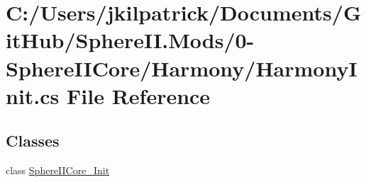 \hypertarget{0-_sphere_i_i_core_2_harmony_2_harmony_init_8cs}{}\section{C\+:/\+Users/jkilpatrick/\+Documents/\+Git\+Hub/\+Sphere\+II.Mods/0-\/\+Sphere\+I\+I\+Core/\+Harmony/\+Harmony\+Init.cs File Reference}
\label{0-_sphere_i_i_core_2_harmony_2_harmony_init_8cs}
\subsection*{Classes}
\begin{DoxyCompactItemize}
\item 
class \mbox{\hyperlink{class_sphere_i_i_core___init}{Sphere\+I\+I\+Core\+\_\+\+Init}}
\end{DoxyCompactItemize}
